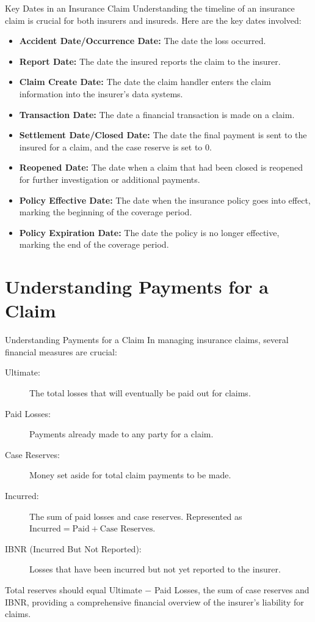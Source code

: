 \documentclass[compress,mathserif]{beamer}
\begin{document}
\begin{frame}{Key Dates in an Insurance Claim}
    Understanding the timeline of an insurance claim is crucial for both insurers and insureds. Here are the key dates involved:

    \begin{itemize}
        \item \textbf{Accident Date/Occurrence Date:} The date the loss occurred.
        \item \textbf{Report Date:} The date the insured reports the claim to the insurer.
        \item \textbf{Claim Create Date:} The date the claim handler enters the claim information into the insurer's data systems.
        \item \textbf{Transaction Date:} The date a financial transaction is made on a claim.
        \item \textbf{Settlement Date/Closed Date:} The date the final payment is sent to the insured for a claim, and the case reserve is set to 0.
        \item \textbf{Reopened Date:} The date when a claim that had been closed is reopened for further investigation or additional payments.
        \item \textbf{Policy Effective Date:} The date when the insurance policy goes into effect, marking the beginning of the coverage period.
        \item \textbf{Policy Expiration Date:} The date the policy is no longer effective, marking the end of the coverage period.
    \end{itemize}
\end{frame}

\section{Understanding Payments for a Claim}

\begin{frame}{Understanding Payments for a Claim}
    In managing insurance claims, several financial measures are crucial:

    \begin{description}
        \item[Ultimate:] The total losses that will eventually be paid out for claims.
        \item[Paid Losses:] Payments already made to any party for a claim.
        \item[Case Reserves:] Money set aside for total claim payments to be made.
        \item[Incurred:] The sum of paid losses and case reserves. Represented as \( \text{Incurred} = \text{Paid} + \text{Case Reserves} \).
        \item[IBNR (Incurred But Not Reported):] Losses that have been incurred but not yet reported to the insurer.
    \end{description}
    Total reserves should equal Ultimate $-$ Paid Losses, the sum of case reserves and IBNR, providing a comprehensive financial overview of the insurer's liability for claims.
\end{frame}
\end{document}
